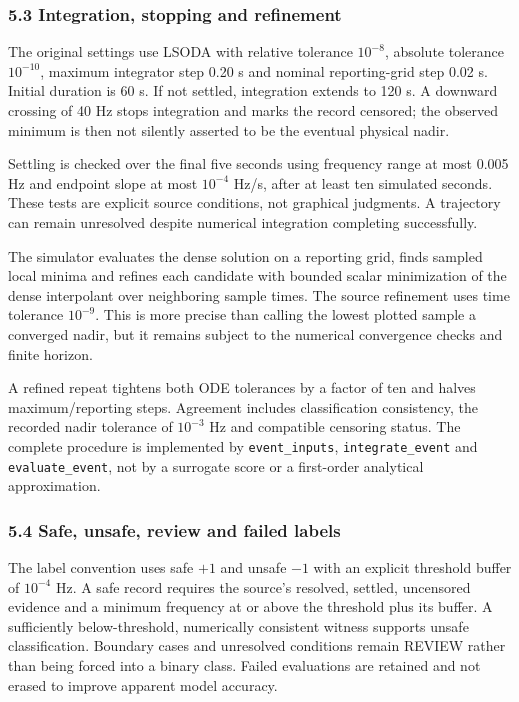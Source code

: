 \documentclass[
  11pt,
  a4paper,
]{article}
\begin{document}
\subsubsection{5.3 Integration, stopping and
refinement}\label{integration-stopping-and-refinement}

The original settings use LSODA with relative tolerance \(10^{-8}\),
absolute tolerance \(10^{-10}\), maximum integrator step 0.20 s and
nominal reporting-grid step 0.02 s. Initial duration is 60 s. If not
settled, integration extends to 120 s. A downward crossing of 40 Hz
stops integration and marks the record censored; the observed minimum is
then not silently asserted to be the eventual physical nadir.

Settling is checked over the final five seconds using frequency range at
most 0.005 Hz and endpoint slope at most \(10^{-4}\) Hz/s, after at
least ten simulated seconds. These tests are explicit source conditions,
not graphical judgments. A trajectory can remain unresolved despite
numerical integration completing successfully.

The simulator evaluates the dense solution on a reporting grid, finds
sampled local minima and refines each candidate with bounded scalar
minimization of the dense interpolant over neighboring sample times. The
source refinement uses time tolerance \(10^{-9}\). This is more precise
than calling the lowest plotted sample a converged nadir, but it remains
subject to the numerical convergence checks and finite horizon.

A refined repeat tightens both ODE tolerances by a factor of ten and
halves maximum/reporting steps. Agreement includes classification
consistency, the recorded nadir tolerance of \(10^{-3}\) Hz and
compatible censoring status. The complete procedure is implemented by
\texttt{event\_inputs}, \texttt{integrate\_event} and
\texttt{evaluate\_event}, not by a surrogate score or a first-order
analytical approximation.

\subsubsection{5.4 Safe, unsafe, review and failed
labels}\label{safe-unsafe-review-and-failed-labels}

The label convention uses safe \(+1\) and unsafe \(-1\) with an explicit
threshold buffer of \(10^{-4}\) Hz. A safe record requires the source's
resolved, settled, uncensored evidence and a minimum frequency at or
above the threshold plus its buffer. A sufficiently below-threshold,
numerically consistent witness supports unsafe classification. Boundary
cases and unresolved conditions remain REVIEW rather than being forced
into a binary class. Failed evaluations are retained and not erased to
improve apparent model accuracy.
\end{document}
